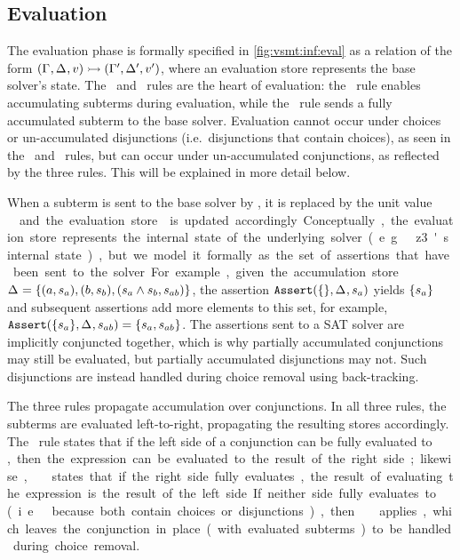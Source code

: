 \subsection{Evaluation}
%
The evaluation phase is formally specified in \autoref{fig:vsmt:inf:eval} as a
relation of the form
$(\Gamma_{},\Delta_{},v)\rightarrowtail{}(\Gamma_{}',\Delta_{}',v')$, where an
evaluation store \eStore{} represents the base solver's state.
%
The \evAcc\ and \evSym\ rules are the heart of evaluation: the \evAcc\ rule
enables accumulating subterms during evaluation, while the \evSym\ rule sends a
fully accumulated subterm to the base solver. Evaluation cannot occur under
choices or un-accumulated disjunctions (i.e.\ disjunctions that contain
choices), as seen in the \evChc\ and \evOr\ rules, but can occur under
un-accumulated conjunctions, as reflected by the three  rules. This
will be explained in more detail below.


When a subterm is sent to the base solver by \evSym, it is replaced by the unit
value \unit\ and the evaluation store \eStore{} is updated accordingly.
%
Conceptually, the evaluation store represents the internal state of the
underlying solver (e.g.\ z3's internal state), but we model it formally as the
set of assertions that have been sent to the solver. For example, given the
accumulation store $\aStore{}=\set{(a,s_a),(b,s_b),(s_a \wedge s_b, s_{ab})}$,
the assertion $\passert(\set{},\aStore{},s_{a})$ yields $\set{s_a}$ and
subsequent assertions add more elements to this set, for example,
$\passert(\set{s_a},\aStore{},s_{ab})=\set{s_a,s_{ab}}$.
%
The assertions sent to a SAT solver are implicitly conjuncted together, which
is why partially accumulated conjunctions may still be evaluated, but partially
accumulated disjunctions may not. Such disjunctions are instead handled during
choice removal using back-tracking.


The three  rules propagate accumulation over conjunctions. In all
three rules, the subterms are evaluated left-to-right, propagating the
resulting stores accordingly.
%
The \evAndL\ rule states that if the left side of a conjunction can be fully
evaluated to \unit, then the expression can be evaluated to the result of the
right side; likewise, \evAndR\ states that if the right side fully evaluates,
the result of evaluating the expression is the result of the left side. If
neither side fully evaluates to \unit\ (i.e.\ because both contain choices or
disjunctions), then \evAnd\ applies, which leaves the conjunction in place
(with evaluated subterms) to be handled during choice removal.


